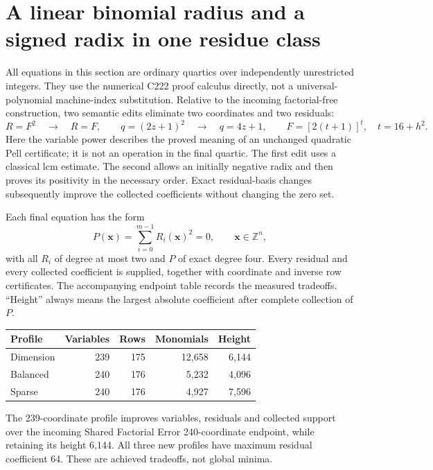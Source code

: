 \section{A linear binomial radius and a signed radix in one residue class}
\label{sec:r20-direct}

All equations in this section are ordinary quartics over independently
unrestricted integers.  They use the numerical C222 proof calculus directly,
not a universal-polynomial machine-index substitution.  Relative to the
incoming factorial-free construction, two semantic edits eliminate two
coordinates and two residuals:
\[
 R=F^2\quad\longrightarrow\quad R=F,
 \qquad
 q=(2z+1)^2\quad\longrightarrow\quad q=4z+1,
 \qquad F=[2(t+1)]^t,\quad t=16+h^2.
\]
Here the variable power describes the proved meaning of an unchanged
quadratic Pell certificate; it is not an operation in the final quartic.
The first edit uses a classical lcm estimate.  The second allows an
initially negative radix and then proves its positivity in the necessary
order.  Exact residual-basis changes subsequently improve the collected
coefficients without changing the zero set.

Each final equation has the form
\[
 P(\boldsymbol x)=\sum_{i=0}^{m-1}R_i(\boldsymbol x)^2=0,
 \qquad\boldsymbol x\in\mathbb Z^n,
\]
with all $R_i$ of degree at most two and $P$ of exact degree four.  Every
residual and every collected coefficient is supplied, together with
coordinate and inverse row certificates.  The accompanying endpoint table
records the measured tradeoffs.  ``Height'' always means the largest
absolute coefficient after complete collection of $P$.
\begin{center}
\begin{tabular}{lrrrr}
\toprule
Profile & Variables & Rows & Monomials & Height\\
\midrule
Dimension & 239 & 175 & 12,658 & 6,144\\
Balanced & 240 & 176 & 5,232 & 4,096\\
Sparse & 240 & 176 & 4,927 & 7,596\\
\bottomrule
\end{tabular}
\end{center}
The 239-coordinate profile improves variables, residuals and collected
support over the incoming Shared Factorial Error 240-coordinate endpoint,
while retaining its height 6,144.  All three new profiles have maximum
residual coefficient 64.  These are achieved tradeoffs, not global minima.

